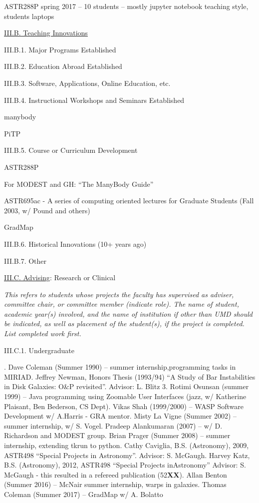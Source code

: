 \documentclass[11pt,letterpaper]{article}
\newcommand{\newi}{\newline\indent}
\begin{document}
ASTR288P spring 2017 -- 10 students -- mostly jupyter notebook teaching style, students laptops


\underline{III.B. Teaching Innovations}

III.B.1. Major Programs Established

III.B.2. Education Abroad Established
 
III.B.3. Software, Applications, Online Education, etc.

III.B.4. Instructional Workshops and Seminars Established

manybody

PiTP

III.B.5. Course or Curriculum Development

ASTR288P

For MODEST and GH: ``The ManyBody Guide''

ASTR695ac - A series of computing oriented lectures for Graduate Students (Fall 2003, w/ Pound and others)

GradMap 



III.B.6. Historical Innovations (10+ years ago)

III.B.7. Other


\underline{III.C. Advising}: Research or Clinical

\textit{This refers to students whose projects the faculty has supervised as adviser, committee chair, or committee member (indicate role). The name of student, academic year(s) involved, and the name of institution if other than UMD should be indicated, as well as placement of the student(s), if the project is completed.  List completed work first.}

III.C.1. Undergraduate

. Dave Coleman (Summer 1990) -- summer internship,programming tasks in MIRIAD\newi
2. Jeffrey Newman, Honors Thesis (1993/94) ``A Study of Bar Instabilities in Disk Galaxies: O\&P revisited''. Advisor: L. Blitz
3. Rotimi Osunsan (summer 1999) -- Java programming using Zoomable User Interfaces (jazz, w/ Katherine Plaisant, Ben Bederson, CS Dept)\newi
4. Vikas Shah (1999/2000) -- WASP Software Development w/ A.Harris - GRA mentor\newi
5. Misty La Vigne (Summer 2002) -- summer internship, w/ S. Vogel\newi
6. Pradeep Alankumaran (2007) -- w/ D. Richardson and MODEST group\newi
7. Brian Prager (Summer 2008) -- summer internship, extending tkrun to python\newi
8. Cathy Caviglia, B.S. (Astronomy), 2009,  ASTR498 ``Special Projects in Astronomy''.  Advisor:  S. McGaugh\newi
9. Harvey Katz, B.S. (Astronomy), 2012,  ASTR498  ``Special Projects inAstronomy''
 Advisor:  S. McGaugh -  this resulted in a refereed publication (52{\bf XX})\newi
10. Allan Benton (Summer 2016) -- McNair summer internship, warps in galaxies\newi
11. Thomas Coleman (Summer 2017) -- GradMap w/ A. Bolatto\newi
\end{document}
